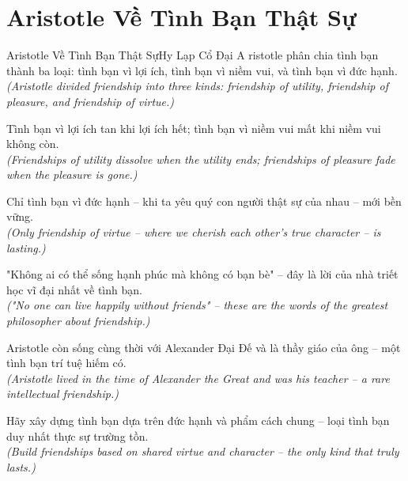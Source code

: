 \section{Aristotle Về Tình Bạn Thật Sự}
\begin{truyen}{Aristotle Về Tình Bạn Thật Sự}{Hy Lạp Cổ Đại}
A ristotle phân chia tình bạn thành ba loại: tình bạn vì lợi ích, tình bạn vì niềm vui, và tình bạn vì đức hạnh.\\
\textit{(Aristotle divided friendship into three kinds: friendship of utility, friendship of pleasure, and friendship of virtue.)}

Tình bạn vì lợi ích tan khi lợi ích hết; tình bạn vì niềm vui mất khi niềm vui không còn.\\
\textit{(Friendships of utility dissolve when the utility ends; friendships of pleasure fade when the pleasure is gone.)}

Chỉ tình bạn vì đức hạnh -- khi ta yêu quý con người thật sự của nhau -- mới bền vững.\\
\textit{(Only friendship of virtue -- where we cherish each other's true character -- is lasting.)}

"Không ai có thể sống hạnh phúc mà không có bạn bè" -- đây là lời của nhà triết học vĩ đại nhất về tình bạn.\\
\textit{("No one can live happily without friends" -- these are the words of the greatest philosopher about friendship.)}

Aristotle còn sống cùng thời với Alexander Đại Đế và là thầy giáo của ông -- một tình bạn trí tuệ hiếm có.\\
\textit{(Aristotle lived in the time of Alexander the Great and was his teacher -- a rare intellectual friendship.)}

\end{truyen}
\begin{baihoc}
  Hãy xây dựng tình bạn dựa trên đức hạnh và phẩm cách chung -- loại tình bạn duy nhất thực sự trường tồn.\\
  \textit{(Build friendships based on shared virtue and character -- the only kind that truly lasts.)}
\end{baihoc}

